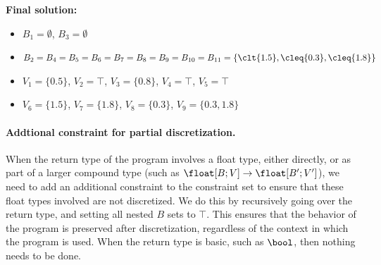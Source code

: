 \begin{example}
    \textbf{Final solution:}
    \begin{itemize}
        \item $B_1 = \emptyset$, $B_3 = \emptyset$
        \item $B_2 = B_4 = B_5 = B_6 = B_7 = B_8 = B_9 = B_{10} = B_{11} = \{\clt{1.5}, \cleq{0.3}, \cleq{1.8}\}$
        \item $V_1 = \{0.5\}$, $V_2 = \top$, $V_3 = \{0.8\}$, $V_4 = \top$, $V_5 = \top$
        \item $V_6 = \{1.5\}$, $V_7 = \{1.8\}$, $V_8 = \{0.3\}$, $V_9 = \{0.3, 1.8\}$
    \end{itemize}
\end{example}

\paragraph{Addtional constraint for partial discretization.} 
When the return type of the program involves a float type, either directly, or as part of a larger compound type (such as $\float[B;V] \to \float[B';V']$), we need to add an additional constraint to the constraint set to ensure that these float types involved are not discretized. We do this by recursively going over the return type, and setting all nested $B$ sets to $\top$. This ensures that the behavior of the program is preserved after discretization, regardless of the context in which the program is used. When the return type is basic, such as $\bool$, then nothing needs to be done.